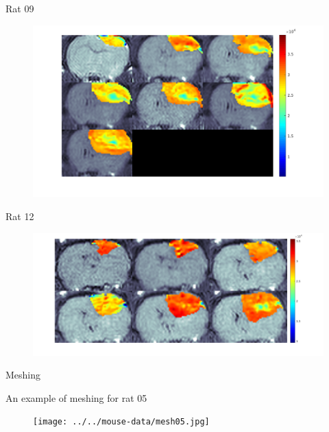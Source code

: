 \documentclass{beamer}
\begin{document}
\begin{frame}{Rat 09}
    \begin{minipage}[t][.7\textheight][t]{\textwidth}
    	\begin{figure}
    	\centering
    	\includegraphics[width=.9\textwidth]{../../mouse-data/Montage09.png}
    	\end{figure}
	\end{minipage}  
\end{frame}

\begin{frame}{Rat 12}
    \begin{minipage}[t][.7\textheight][t]{\textwidth}
    	\begin{figure}
    	\centering
    	\includegraphics[width=.9\textwidth]{../../mouse-data/Montage12.png}
    	\end{figure}
	\end{minipage}  
\end{frame}

\begin{frame}{Meshing}
    \begin{minipage}[t][.7\textheight][t]{\textwidth}
    An example of meshing for rat 05
    	\begin{figure}
    	\centering
    	\texttt{[image: ../../mouse-data/mesh05.jpg]}
    	\end{figure}
	\end{minipage}  
\end{frame}
\end{document}
